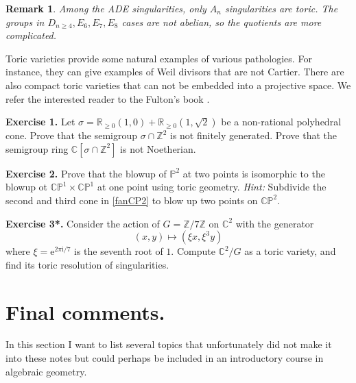 \documentclass[11pt]{article}
\numberwithin{equation}{section}
\numberwithin{footnote}{section}
\newtheorem{rem}[thm]{Remark}
\newcommand{\ee}{{\mathrm e}}
\newcommand{\ii}{{\mathrm i}}
\renewcommand{\P}{{\mathbb P}}
\newcommand{\R}{{\mathbb R}}
\newcommand{\Z}{{\mathbb Z}}
\newcommand{\C}{{\mathbb C}}
\begin{document}


\smallskip
\begin{rem}
Among the ADE singularities, only $A_n$ singularities are toric. The groups in $D_{n\geq 4},E_6,E_7,E_8$ cases are not abelian, so the quotients are more complicated.
\end{rem} 

\smallskip
Toric varieties provide some natural examples of various pathologies. For instance, they can give examples of Weil divisors that are not Cartier. There are also compact toric  varieties that can not be embedded into a projective space. We refer the interested reader to the Fulton's book \cite{Fulton-toric}.

{\bf Exercise 1.} Let $\sigma =\R_{\geq 0}(1,0) + \R_{\geq 0}(1,\sqrt 2)$ be a non-rational polyhedral cone. Prove that the 
semigroup $\sigma \cap \Z^2$ is not finitely generated. Prove that the semigroup ring $\C[\sigma \cap \Z^2]$ is not Noetherian. 

{\bf Exercise 2.} Prove that the blowup of $\P^2$ at two points is isomorphic to the blowup ot $\C\P^1 \times \C\P^1$ at one point using toric geometry. \emph{Hint:} Subdivide the second and third cone in \eqref{fanCP2} to blow up two points on $\C\P^2$.

{\bf Exercise 3*.} Consider the action of $G=\Z/7\Z$ on $\C^2$ with the generator
$$
(x,y) \mapsto (\xi x, \xi^3 y)
$$
where $\xi=\ee^{2\pi\ii/7}$ is the seventh root of $1$. Compute $\C^2/G$ as a toric variety, and find its toric resolution of singularities.


\section{Final comments.}
In this section I  want to list several topics that unfortunately did not make it into these notes but could perhaps be included in an introductory course in algebraic geometry.
\end{document}
